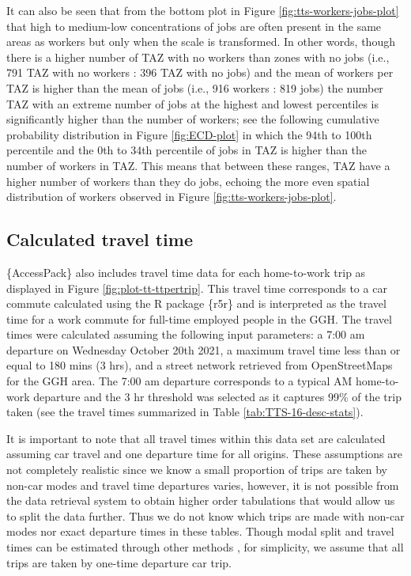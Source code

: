\documentclass[Royal,times,sageh]{sagej}
\begin{document}
It can also be seen that from the bottom plot in Figure
\ref{fig:tts-workers-jobs-plot} that high to medium-low concentrations
of jobs are often present in the same areas as workers but only when the
scale is transformed. In other words, though there is a higher number of
TAZ with no workers than zones with no jobs (i.e., 791 TAZ with no
workers : 396 TAZ with no jobs) and the mean of workers per TAZ is
higher than the mean of jobs (i.e., 916 workers : 819 jobs) the number
TAZ with an extreme number of jobs at the highest and lowest percentiles
is significantly higher than the number of workers; see the following
cumulative probability distribution in Figure \ref{fig:ECD-plot} in
which the 94th to 100th percentile and the 0th to 34th percentile of
jobs in TAZ is higher than the number of workers in TAZ. This means that
between these ranges, TAZ have a higher number of workers than they do
jobs, echoing the more even spatial distribution of workers observed in
Figure \ref{fig:tts-workers-jobs-plot}.

\newpage

\hypertarget{calculated-travel-time}{%
\subsection{Calculated travel time}\label{calculated-travel-time}}

\{AccessPack\} also includes travel time data for each home-to-work trip
as displayed in Figure \ref{fig:plot-tt-ttpertrip}. This travel time
corresponds to a car commute calculated using the R package \{r5r\} and
is interpreted as the travel time for a work commute for full-time
employed people in the GGH. The travel times were calculated assuming
the following input parameters: a 7:00 am departure on Wednesday October
20th 2021, a maximum travel time less than or equal to 180 mins (3 hrs),
and a street network retrieved from OpenStreetMaps for the GGH area. The
7:00 am departure corresponds to a typical AM home-to-work departure and
the 3 hr threshold was selected as it captures 99\% of the trip taken
(see the travel times summarized in Table \ref{tab:TTS-16-desc-stats}).

It is important to note that all travel times within this data set are
calculated assuming car travel and one departure time for all origins.
These assumptions are not completely realistic since we know a small
proportion of trips are taken by non-car modes and travel time
departures varies, however, it is not possible from the data retrieval
system to obtain higher order tabulations that would allow us to split
the data further. Thus we do not know which trips are made with non-car
modes nor exact departure times in these tables. Though modal split and
travel times can be estimated through other methods
\citep[e.g.,][]{allen_suburbanization_2021, higgins2021changes}, for
simplicity, we assume that all trips are taken by one-time departure car
trip.
\end{document}

